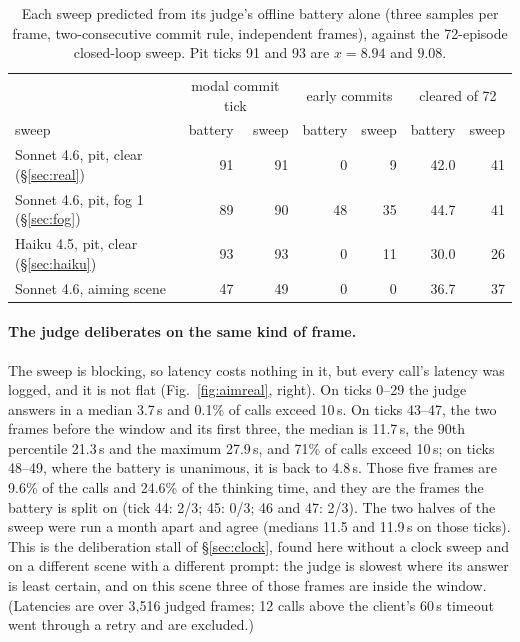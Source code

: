 \documentclass[11pt]{article}
\begin{document}
\begin{table}[h]
\centering
\small
\caption{Each sweep predicted from its judge's offline battery alone (three
samples per frame, two-consecutive commit rule, independent frames), against
the 72-episode closed-loop sweep. Pit ticks 91 and 93 are $x = 8.94$ and
$9.08$.}
\label{tab:battery}
\begin{tabular}{lrrrrrr}
\toprule
 & \multicolumn{2}{c}{modal commit tick} & \multicolumn{2}{c}{early commits} & \multicolumn{2}{c}{cleared of 72} \\
sweep & battery & sweep & battery & sweep & battery & sweep \\
\midrule
Sonnet 4.6, pit, clear (\S\ref{sec:real}) & 91 & 91 & 0 & 9 & 42.0 & 41 \\
Sonnet 4.6, pit, fog 1 (\S\ref{sec:fog}) & 89 & 90 & 48 & 35 & 44.7 & 41 \\
Haiku 4.5, pit, clear (\S\ref{sec:haiku}) & 93 & 93 & 0 & 11 & 30.0 & 26 \\
Sonnet 4.6, aiming scene & 47 & 49 & 0 & 0 & 36.7 & 37 \\
\bottomrule
\end{tabular}
\end{table}

\paragraph{The judge deliberates on the same kind of frame.} The sweep is
blocking, so latency costs nothing in it, but every call's latency was
logged, and it is not flat (Fig.~\ref{fig:aimreal}, right). On ticks 0--29
the judge answers in a median 3.7\,s and 0.1\% of calls exceed 10\,s. On
ticks 43--47, the two frames before the window and its first three, the
median is 11.7\,s, the 90th percentile 21.3\,s and the maximum 27.9\,s,
and 71\% of calls exceed 10\,s; on ticks 48--49, where the battery is
unanimous, it is back to 4.8\,s. Those five frames are 9.6\% of the calls
and 24.6\% of the thinking time, and they are the frames the battery is
split on (tick 44: 2/3; 45: 0/3; 46 and 47: 2/3). The two halves of the
sweep were run a month apart and agree (medians 11.5 and 11.9\,s on those
ticks). This is the deliberation stall of \S\ref{sec:clock}, found here
without a clock sweep and on a different scene with a different prompt: the
judge is slowest where its answer is least certain, and on this scene three
of those frames are inside the window. (Latencies are over 3{,}516 judged
frames; 12 calls above the client's 60\,s timeout went through a retry and
are excluded.)
\end{document}
